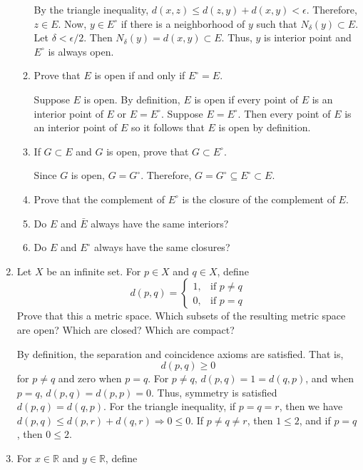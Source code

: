 \begin{enumerate}
\begin{enumerate}[label = (\alph*)]
    By the triangle inequality, \(d(x,z)\leq d(z,y) + d(x,y) < \epsilon\).
    Therefore, \(z\in E\).
    Now, \(y\in E^{\circ}\) if there is a neighborhood of \(y\) such that
    \(N_{\delta}(y)\subset E\).
    Let \(\delta < \epsilon/2\).
    Then \(N_{\delta}(y) = d(x,y)\subset E\).
    Thus, \(y\) is interior point and \(E^{\circ}\) is always open.
  \item
    Prove that \(E\) is open if and only if \(E^{\circ} = E\).
    \par\smallskip
    Suppose \(E\) is open.
    By definition, \(E\) is open if every point of \(E\) is an interior point
    of \(E\) or \(E = E^{\circ}\).
    Suppose \(E = E^{\circ}\).
    Then every point of \(E\) is an interior point of \(E\) so it follows that
    \(E\) is open by definition.
  \item
    If \(G\subset E\) and \(G\) is open, prove that \(G\subset E^{\circ}\).
    \par\smallskip
    Since \(G\) is open, \(G = G^{\circ}\).
    Therefore, \(G = G^{\circ}\subseteq E^{\circ}\subset E\).
  \item
    Prove that the complement of \(E^{\circ}\) is the closure of the
    complement of \(E\).
  \item
    Do \(E\) and \(\bar{E}\) always have the same interiors?
  \item
    Do \(E\) and \(E^{\circ}\) always have the same closures?
  \end{enumerate}
\item
  Let \(X\) be an infinite set.
  For \(p\in X\) and \(q\in X\), define
  \[
  d(p, q) =
  \begin{cases}
    1, & \text{if } p\neq q\\
    0, & \text{if } p = q
  \end{cases}
  \]
  Prove that this a metric space.
  Which subsets of the resulting metric space are open?
  Which are closed? Which are compact?
  \par\smallskip
  By definition, the separation and coincidence axioms are satisfied.
  That is,
  \[
  d(p, q)\geq 0
  \]
  for \(p\neq q\) and zero when \(p = q\).
  For \(p\neq q\), \(d(p,q) = 1 = d(q,p)\), and when \(p = q\),
  \(d(p,q) = d(p,p) = 0\).
  Thus, symmetry is satisfied \(d(p,q) = d(q,p)\).
  For the triangle inequality, if \(p = q = r\), then we have
  \(d(p,q)\leq d(p,r) + d(q,r)\Rightarrow 0\leq 0\).
  If \(p\neq q\neq r\), then \(1\leq 2\), and if \(p = q\), then \(0\leq 2\).
\item
  For \(x\in\mathbb{R}\) and \(y\in\mathbb{R}\), define

\end{enumerate}
